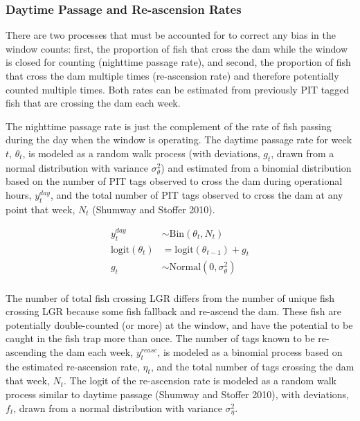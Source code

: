 \documentclass[
  12pt,
]{article}
\begin{document}
\hypertarget{daytime-passage-and-re-ascension-rates}{%
\subsubsection{Daytime Passage and Re-ascension Rates}\label{daytime-passage-and-re-ascension-rates}}

There are two processes that must be accounted for to correct any bias in the window counts: first, the proportion of fish that cross the dam while the window is closed for counting (nighttime passage rate), and second, the proportion of fish that cross the dam multiple times (re-ascension rate) and therefore potentially counted multiple times. Both rates can be estimated from previously PIT tagged fish that are crossing the dam each week.

The nighttime passage rate is just the complement of the rate of fish passing during the day when the window is operating. The daytime passage rate for week \(t\), \(\theta_t\), is modeled as a random walk process (with deviations, \(g_t\), drawn from a normal distribution with variance \(\sigma^2_{\theta}\)) and estimated from a binomial distribution based on the number of PIT tags observed to cross the dam during operational hours, \(y^{day}_t\), and the total number of PIT tags observed to cross the dam at any point that week, \(N_t\) (Shumway and Stoffer 2010).

\begin{equation}
  \begin{aligned}
    y^{day}_t &\sim \text{Bin} \left(\theta_t, N_t \right) \\
    \text{logit} (\theta_{t}) &= \text{logit} \left( \theta_{t-1} \right) + g_t \\
    g_t &\sim \text{Normal}(0, \sigma^2_\theta) \\
  \end{aligned}
\end{equation}

The number of total fish crossing LGR differs from the number of unique fish crossing LGR because some fish fallback and re-ascend the dam. These fish are potentially double-counted (or more) at the window, and have the potential to be caught in the fish trap more than once. The number of tags known to be re-ascending the dam each week, \(y^{reasc}_t\), is modeled as a binomial process based on the estimated re-ascension rate, \(\eta_t\), and the total number of tags crossing the dam that week, \(N_t\). The logit of the re-ascension rate is modeled as a random walk process similar to daytime passage (Shumway and Stoffer 2010), with deviations, \(f_t\), drawn from a normal distribution with variance \(\sigma^2_\eta\).
\end{document}
